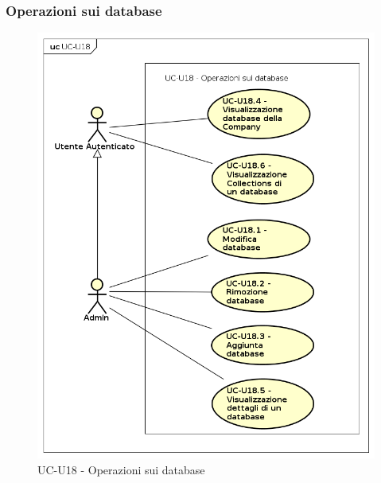 \subsubsection{Operazioni sui database}

    \begin{figure}[H]
      \begin{center}
        \includegraphics[width=12cm]{res/img/UCUtenti/UCUtenteA/UC-U18-OperazioniDatabase/UC-U18-OperazioniDatabase.png}
      \caption{UC-U18 - Operazioni sui database}
      \end{center} 
    \end{figure}    
    
